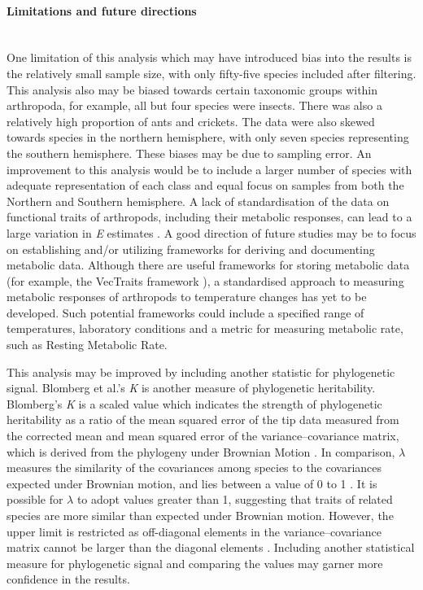 \documentclass[11pt]{article}
\begin{document}
\begin{flushleft}
\paragraph{Limitations and future directions}\mbox{}\\
One limitation of this analysis which may have introduced bias into the results is the relatively small sample size, with only fifty-five species included after filtering. This analysis also may be biased towards certain taxonomic groups within arthropoda, for example, all but four species were insects. There was also a relatively high proportion of ants and crickets. The data were also skewed towards species in the northern hemisphere, with only seven species representing the southern hemisphere. These biases may be due to sampling error. An improvement to this analysis would be to include a larger number of species with adequate representation of each class and equal focus on samples from both the Northern and Southern hemisphere. 
\linebreak
A lack of standardisation of the data on functional traits of arthropods, including their metabolic responses, can lead to a large variation in \emph{E} estimates \citep{pawar2016real}. A good direction of future studies may be to focus on establishing and/or utilizing frameworks for deriving and documenting metabolic data. Although there are useful frameworks for storing metabolic data (for example, the VecTraits framework \citep{samraat_pawar_2016_57356}), a standardised approach to measuring metabolic responses of arthropods to temperature changes has yet to be developed. Such potential frameworks could include a specified range of temperatures, laboratory conditions and a metric for measuring metabolic rate, such as Resting Metabolic Rate.
\linebreak

This analysis may be improved by including another statistic for phylogenetic signal. Blomberg et al.'s \emph{K} \citep{blomberg2003testing} is another measure of phylogenetic heritability. Blomberg's \emph{K} is a scaled value which indicates the strength of phylogenetic heritability as a ratio of the mean squared error of the tip data measured from the corrected mean and mean squared error of the variance–covariance matrix, which is derived from the phylogeny under Brownian Motion \citep{blomberg2003testing,munkemuller2012measure}. In comparison, $\lambda$ measures the similarity of the covariances among species to the covariances expected under Brownian motion, and lies between a value of 0 to 1 \citep{munkemuller2012measure}. It is possible for $\lambda$ to adopt values greater than 1, suggesting that traits of related species are more similar than expected under Brownian motion. However, the upper limit is restricted as off-diagonal elements in the variance–covariance matrix cannot be larger than
the diagonal elements \citep{munkemuller2012measure}. Including another statistical measure for phylogenetic signal and comparing the values may garner more confidence in the results.
\linebreak 


\end{flushleft}
\end{document}
